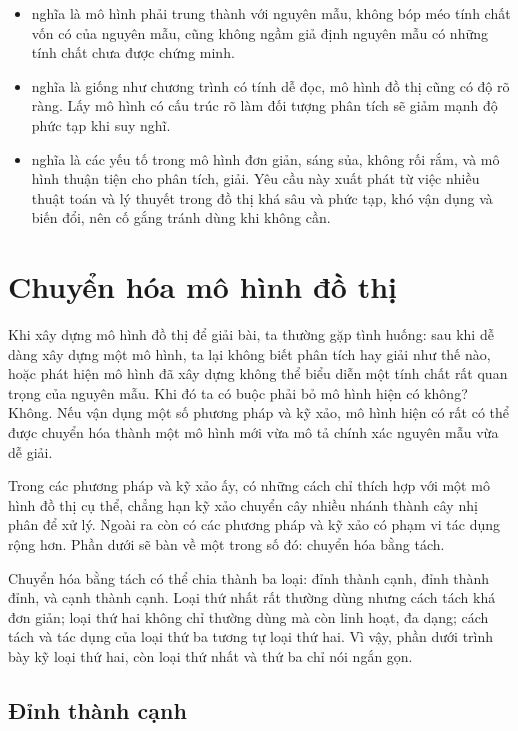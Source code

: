 \documentclass[11pt]{article}
\begin{document}
\begin{itemize}
  \item {} nghĩa là mô hình phải trung thành với nguyên mẫu,
  không bóp méo tính chất vốn có của nguyên mẫu, cũng không ngầm giả định
  nguyên mẫu có những tính chất chưa được chứng minh.
  \item {} nghĩa là giống như chương trình có tính dễ đọc, mô
  hình đồ thị cũng có độ rõ ràng. Lấy mô hình có cấu trúc rõ làm đối tượng
  phân tích sẽ giảm mạnh độ phức tạp khi suy nghĩ.
  \item {} nghĩa là các yếu tố trong mô hình đơn giản, sáng sủa,
  không rối rắm, và mô hình thuận tiện cho phân tích, giải. Yêu cầu này xuất
  phát từ việc nhiều thuật toán và lý thuyết trong đồ thị khá sâu và phức
  tạp, khó vận dụng và biến đổi, nên cố gắng tránh dùng khi không cần.
\end{itemize}

\section{Chuyển hóa mô hình đồ thị}

Khi xây dựng mô hình đồ thị để giải bài, ta thường gặp tình huống: sau khi
dễ dàng xây dựng một mô hình, ta lại không biết phân tích hay giải như thế
nào, hoặc phát hiện mô hình đã xây dựng không thể biểu diễn một tính chất rất
quan trọng của nguyên mẫu. Khi đó ta có buộc phải bỏ mô hình hiện có không?
Không. Nếu vận dụng một số phương pháp và kỹ xảo, mô hình hiện có rất có thể
được chuyển hóa thành một mô hình mới vừa mô tả chính xác nguyên mẫu vừa dễ
giải.

Trong các phương pháp và kỹ xảo ấy, có những cách chỉ thích hợp với một mô
hình đồ thị cụ thể, chẳng hạn kỹ xảo chuyển cây nhiều nhánh thành cây nhị
phân để xử lý. Ngoài ra còn có các phương pháp và kỹ xảo có phạm vi tác dụng
rộng hơn. Phần dưới sẽ bàn về một trong số đó: chuyển hóa bằng tách.

Chuyển hóa bằng tách có thể chia thành ba loại: đỉnh thành cạnh, đỉnh thành
đỉnh, và cạnh thành cạnh. Loại thứ nhất rất thường dùng nhưng cách tách khá
đơn giản; loại thứ hai không chỉ thường dùng mà còn linh hoạt, đa dạng; cách
tách và tác dụng của loại thứ ba tương tự loại thứ hai. Vì vậy, phần dưới
trình bày kỹ loại thứ hai, còn loại thứ nhất và thứ ba chỉ nói ngắn gọn.

\subsection{Đỉnh thành cạnh}
\end{document}
